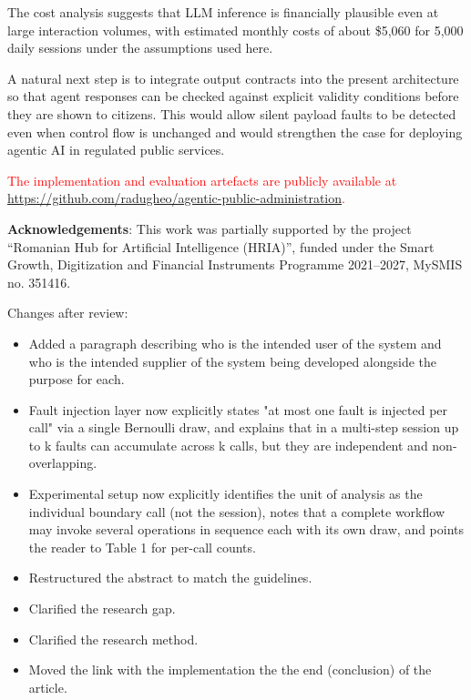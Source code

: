 \documentclass[3p,times,procedia]{elsarticle}
\begin{document}
The cost analysis suggests that LLM inference is financially plausible even at large interaction volumes, with estimated monthly costs of about \$5{,}060 for 5{,}000 daily sessions under the assumptions used here.

A natural next step is to integrate output contracts into the present architecture so that agent responses can be checked against explicit validity conditions before they are shown to citizens. This would allow silent payload faults to be detected even when control flow is unchanged and would strengthen the case for deploying agentic AI in regulated public services.

\textcolor{red}{The implementation and evaluation artefacts are publicly available at \url{https://github.com/radugheo/agentic-public-administration}.}

\textbf{Acknowledgements}:  
This work was partially supported by the project ``Romanian Hub for Artificial Intelligence (HRIA)'', funded under the Smart Growth, Digitization and Financial Instruments Programme 2021--2027, MySMIS no. 351416.




\newpage
Changes after review:
\begin{itemize}
    \item Added a paragraph describing who is the intended user of the system and who is the intended supplier of the system being developed alongside the purpose for each.
    \item Fault injection layer now explicitly states "at most one fault is injected per call" via a single Bernoulli draw, and explains that in a multi-step session up to k faults can accumulate across k calls, but they are independent and non-overlapping.
    \item Experimental setup now explicitly identifies the unit of analysis as the individual boundary call (not the session), notes that a complete workflow may invoke several operations in sequence each with its own draw, and points the reader to Table 1 for per-call counts.
    \item Restructured the abstract to match the guidelines.
    \item Clarified the research gap.
    \item Clarified the research method.
    \item Moved the link with the implementation the the end (conclusion) of the article.
\end{itemize}
\end{document}
